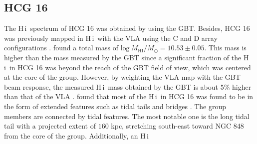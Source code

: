 \documentclass{aa}
\newcommand{\HI}{H\,{\sc i}}
\begin{document}
\subsection{HCG 16}
The \HI\ spectrum of HCG 16 was obtained by \citet{2010ApJ...710..385B} using the GBT. Besides, HCG 16 was previously 
mapped in \HI\ with the VLA using the C and D array configurations \citep{2001A&A...377..812V, 2019A&A...632A..78J}. \citet{2019A&A...632A..78J} 
found a total mass of $\mathrm{log~}M_{\mathrm{HI}}/M_{\odot}=10.53 \pm 0.05$. This mass is higher than the mass measured by the GBT since a 
significant fraction of the \HI\ in HCG 16 was beyond the reach of the GBT field of view, which was centered at the core of the group. However, 
by weighting the VLA map with the GBT beam response, the measured \HI\ mass obtained by the GBT is about 5\% higher than that of the VLA 
\citep{2010ApJ...710..385B}. \citet{2001A&A...377..812V} found that most of the \HI\ in HCG 16 was found to be in the form of extended features such as tidal tails and bridges \citep[see also][]{2019A&A...632A..78J}. The group members are connected by tidal features. 
The most notable one is the long tidal tail with a projected extent of $160$ kpc, stretching south-east toward NGC 848 from the core of the group. Additionally, an \HI\ 
\end{document}
